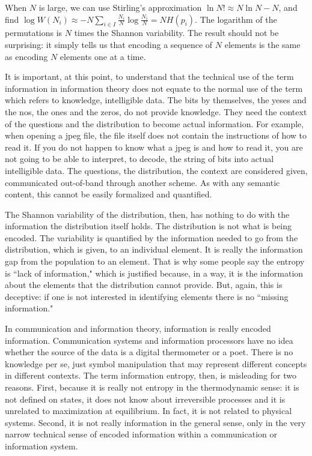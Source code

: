 \documentclass[iopart]{revtex4-1}
\begin{document}
When $N$ is large, we can use Stirling's approximation $\ln N! \approx N \ln N - N$, and find $\log W(N_i) \approx - N \sum_{i \in I} \frac{N_i}{N} \log \frac{N_i}{N} = N H(p_i)$. The logarithm of the permutations is $N$ times the Shannon variability. The result should not be surprising: it simply tells us that encoding a sequence of $N$ elements is the same as encoding $N$ elements one at a time.

It is important, at this point, to understand that the technical use of the term information in information theory does not equate to the normal use of the term which refers to knowledge, intelligible data. The bits by themselves, the yeses and the nos, the ones and the zeros, do not provide knowledge. They need the context of the questions and the distribution to become actual information. For example, when opening a jpeg file, the file itself does not contain the instructions of how to read it. If you do not happen to know what a jpeg is and how to read it, you are not going to be able to interpret, to decode, the string of bits into actual intelligible data. The questions, the distribution, the context are considered given, communicated out-of-band through another scheme. As with any semantic content, this cannot be easily formalized and quantified.

The Shannon variability of the distribution, then, has nothing to do with the information the distribution itself holds. The distribution is not what is being encoded. The variability is quantified by the information needed to go from the distribution, which is given, to an individual element. It is really the information gap from the population to an element. That is why some people say the entropy is ``lack of information," which is justified because, in a way, it is the information about the elements that the distribution cannot provide. But, again, this is deceptive: if one is not interested in identifying elements there is no ``missing information."

In communication and information theory, information is really encoded information. Communication systems and information processors have no idea whether the source of the data is a digital thermometer or a poet. There is no knowledge per se, just symbol manipulation that may represent different concepts in different contexts. The term information entropy, then, is misleading for two reasons. First, because it is really not entropy in the thermodynamic sense: it is not defined on states, it does not know about irreversible processes and it is unrelated to maximization at equilibrium. In fact, it is not related to physical systems. Second, it is not really information in the general sense, only in the very narrow technical sense of encoded information within a communication or information system.
\end{document}
